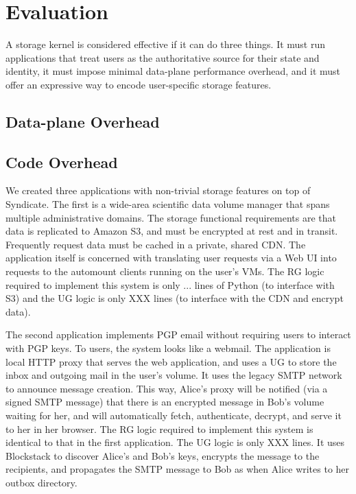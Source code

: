 \section{Evaluation}

A storage kernel is considered effective if it can do three things.  It must
run applications that treat users as the authoritative source for their state and identity,
it must impose minimal data-plane performance overhead, and it must offer an expressive way to
encode user-specific storage features.

\subsection{Data-plane Overhead}


\subsection{Code Overhead}

We created three applications with non-trivial storage features on top of
Syndicate. The first is a wide-area scientific data volume manager that spans
multiple administrative domains. The storage functional requirements are that
data is replicated to Amazon S3, and must be encrypted at rest and in transit.
Frequently request data must be cached in a private, shared CDN. The application
itself is concerned with translating user requests via a Web UI into requests to
the automount clients running on the user's VMs. The RG logic required to
implement this system is only ... lines of Python (to interface with S3) and the
UG logic is only XXX lines (to interface with the CDN and encrypt data).

The second application implements PGP email without requiring users to interact
with PGP keys. To users, the system looks like a webmail. The application is
local HTTP proxy that serves the web application, and uses a UG to store the
inbox and outgoing mail in the user's volume. It uses the legacy SMTP
network to announce message creation. This way, Alice's proxy will be
notified (via a signed SMTP message) that there is an encrypted message in
Bob's volume waiting for her, and will automatically fetch, authenticate,
decrypt, and serve it to her in her browser. The RG logic required to implement
this system is identical to that in the first application. The UG logic is only
XXX lines. It uses Blockstack to discover Alice's and Bob's keys,
encrypts the message to the recipients, and propagates the SMTP message to Bob
as when Alice writes to her outbox directory.

